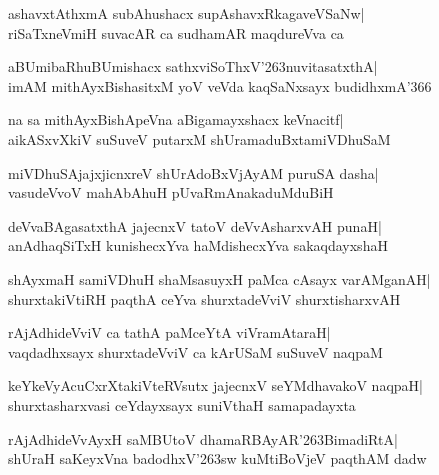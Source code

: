 \documentclass[twoside,12pt,openright]{book}
\def\S{\char'263}
\newcounter{shloka}[chapter]
\begin{document}
\begin{shloka}%
ashavxtAthxmA subAhushacx supAshavxRkagaveVSaNw|\\
riSaTxneVmiH suvacAR ca sudhamAR maqdureVva ca
\end{shloka}

\begin{shloka}%
aBUmibaRhuBUmishacx sathxviSoThxV\S nuvitasatxthA|\\
imAM mithAyxBishasitxM yoV veVda kaqSaNxsayx budidhxmA\char'366
\end{shloka}

\begin{shloka}%
na sa mithAyxBishApeVna aBigamayxshacx keVnacitf|\\
aikASxvXkiV suSuveV putarxM shUramaduBxtamiVDhuSaM
\end{shloka}

\begin{shloka}%
miVDhuSAjajxjicnxreV shUrAdoBxVjAyAM puruSA dasha|\\
vasudeVvoV mahAbAhuH pUvaRmAnakaduMduBiH
\end{shloka}

\begin{shloka}%
deVvaBAgasatxthA jajecnxV tatoV deVvAsharxvAH punaH|\\
anAdhaqSiTxH kunishecxYva haMdishecxYva sakaqdayxshaH
\end{shloka}

\begin{shloka}%
shAyxmaH samiVDhuH shaMsasuyxH paMca cAsayx varAMganAH|\\
shurxtakiVtiRH paqthA ceYva shurxtadeVviV shurxtisharxvAH
\end{shloka}

\begin{shloka}%
rAjAdhideVviV ca tathA paMceYtA viVramAtaraH|\\
vaqdadhxsayx shurxtadeVviV ca kArUSaM suSuveV naqpaM
\end{shloka}

\begin{shloka}%
keYkeVyAcuCxrXtakiVteRVsutx jajecnxV seYMdhavakoV naqpaH|\\
shurxtasharxvasi ceYdayxsayx suniVthaH samapadayxta
\end{shloka}

\begin{shloka}%
rAjAdhideVvAyxH saMBUtoV dhamaRBAyAR\S BimadiRtA|\\
shUraH saKeyxVna badodhxV\S sw kuMtiBoVjeV paqthAM dadw
\end{shloka}
\end{document}
